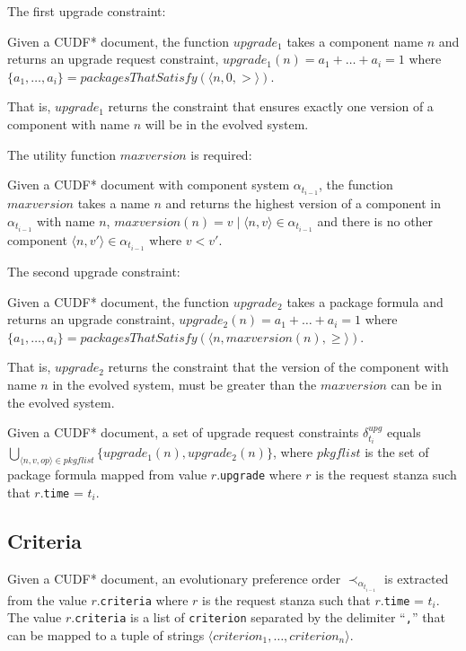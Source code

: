 The first upgrade constraint:
\begin{defs}
Given a CUDF* document, the function  $upgrade_1$ takes a component name $n$ and returns an upgrade request constraint, 
$upgrade_1(n) = a_1 + \ldots + a_i = 1$ where $\{a_1,\ldots,a_i\} = packagesThatSatisfy(\langle n,0,>\rangle)$. 
\end{defs}
That is, $upgrade_1$ returns the constraint that ensures exactly one version of a component with name $n$ will be in the evolved system.

The utility function $maxversion$ is required:
\begin{defs}
Given a CUDF* document with component system $\alpha_{t_{i-1}}$, the function $maxversion$ takes a name $n$ and returns the highest version of a component in $\alpha_{t_{i-1}}$ with name $n$,
$maxversion(n) = v  \mid \langle n,v \rangle \in \alpha_{t_{i-1}}$ and there is no other component $\langle n,v' \rangle \in \alpha_{t_{i-1}}$ where $v < v'$.
\end{defs}

The second upgrade constraint:
\begin{defs}
Given a CUDF* document, the function $upgrade_2$ takes a package formula and returns an upgrade constraint,
$upgrade_2(n) = a_1 + \ldots + a_i = 1$ where $\{a_1,\ldots,a_i\} = packagesThatSatisfy(\langle n,maxversion(n),\geq\rangle)$. 
\end{defs}
That is, $upgrade_2$ returns the constraint that the version of the component with name $n$ in the evolved system, must be greater than the $maxversion$ can be in the evolved system.

\begin{defs}
Given a CUDF* document, a set of upgrade request constraints $\delta_{t_i}^{upg}$ equals $\bigcup \limits_{\langle n,v,op \rangle \in pkgflist} \{upgrade_1(n),upgrade_2(n)\}$, 
where $pkgflist$ is the set of package formula mapped from value $r$.\texttt{upgrade} where $r$ is the request stanza such that $r$.\texttt{time} = $t_i$.
\end{defs}

\subsection{Criteria}
Given a CUDF* document, an evolutionary preference order $\prec_{\alpha_{t_{i-1}}}$ is extracted from the value $r$.\texttt{criteria} where $r$ is the request stanza such that $r$.\texttt{time} = $t_i$.
The value $r$.\texttt{criteria} is a list of \verb+criterion+ separated by the delimiter ``\verb+,+'' that can be mapped to a tuple of strings $\langle criterion_1, \ldots, criterion_n \rangle$.

